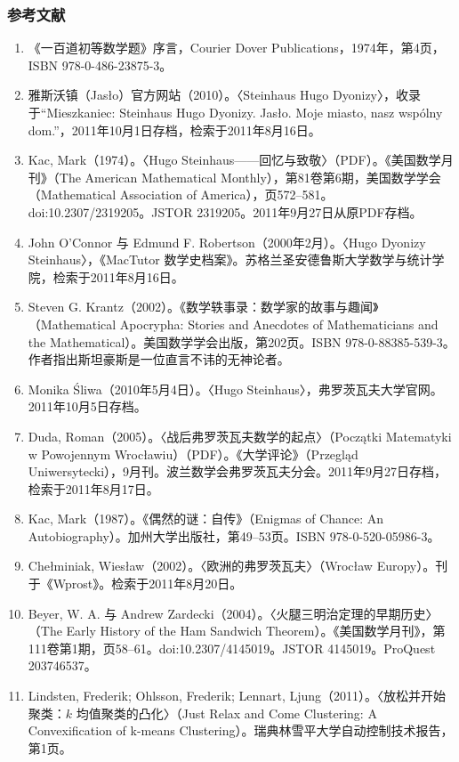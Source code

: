 \subsubsection{参考文献}
\begin{enumerate}
  \item 《一百道初等数学题》序言，Courier Dover Publications，1974年，第4页，ISBN 978-0-486-23875-3。
  \item 雅斯沃镇（Jasło）官方网站（2010）。〈Steinhaus Hugo Dyonizy〉，收录于“Mieszkaniec: Steinhaus Hugo Dyonizy. Jasło. Moje miasto, nasz wspólny dom.”，2011年10月1日存档，检索于2011年8月16日。
  \item Kac, Mark（1974）。〈Hugo Steinhaus——回忆与致敬〉（PDF）。《美国数学月刊》（The American Mathematical Monthly），第81卷第6期，美国数学学会（Mathematical Association of America），页572–581。doi:10.2307/2319205。JSTOR 2319205。2011年9月27日从原PDF存档。
  \item John O'Connor 与 Edmund F. Robertson（2000年2月）。〈Hugo Dyonizy Steinhaus〉，《MacTutor 数学史档案》。苏格兰圣安德鲁斯大学数学与统计学院，检索于2011年8月16日。
  \item Steven G. Krantz（2002）。《数学轶事录：数学家的故事与趣闻》（Mathematical Apocrypha: Stories and Anecdotes of Mathematicians and the Mathematical）。美国数学学会出版，第202页。ISBN 978-0-88385-539-3。作者指出斯坦豪斯是一位直言不讳的无神论者。
  \item Monika Śliwa（2010年5月4日）。〈Hugo Steinhaus〉，弗罗茨瓦夫大学官网。2011年10月5日存档。
  \item Duda, Roman（2005）。〈战后弗罗茨瓦夫数学的起点〉（Początki Matematyki w Powojennym Wrocławiu）（PDF）。《大学评论》（Przegląd Uniwersytecki），9月刊。波兰数学会弗罗茨瓦夫分会。2011年9月27日存档，检索于2011年8月17日。
  \item Kac, Mark（1987）。《偶然的谜：自传》（Enigmas of Chance: An Autobiography）。加州大学出版社，第49–53页。ISBN 978-0-520-05986-3。
  \item Chełminiak, Wiesław（2002）。〈欧洲的弗罗茨瓦夫〉（Wrocław Europy）。刊于《Wprost》。检索于2011年8月20日。
  \item Beyer, W. A. 与 Andrew Zardecki（2004）。〈火腿三明治定理的早期历史〉（The Early History of the Ham Sandwich Theorem）。《美国数学月刊》，第111卷第1期，页58–61。doi:10.2307/4145019。JSTOR 4145019。ProQuest 203746537。
  \item Lindsten, Frederik; Ohlsson, Frederik; Lennart, Ljung（2011）。〈放松并开始聚类：$k$ 均值聚类的凸化〉（Just Relax and Come Clustering: A Convexification of k-means Clustering）。瑞典林雪平大学自动控制技术报告，第1页。

\end{enumerate}
